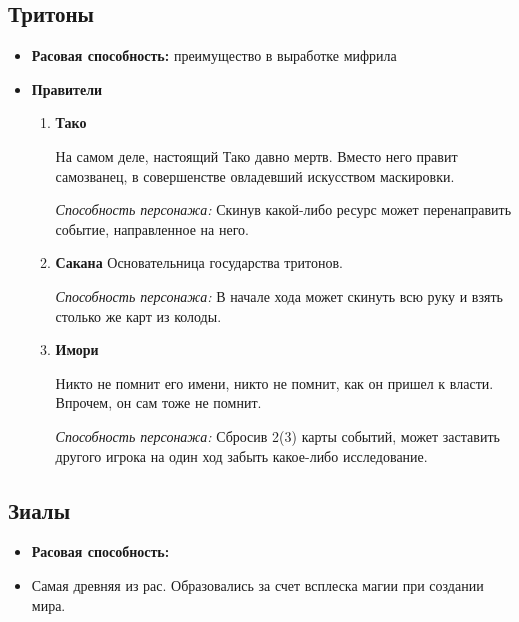 \documentclass[a4paper,12pt,landscape]{article}
\begin{document}
    \subsection{Тритоны}
    \begin{itemize}
      \item \textbf{Расовая способность:} преимущество в выработке мифрила
      \item \textbf{Правители}
        \begin{enumerate}
          \item \textbf{Тако} 
        
          На самом деле, настоящий Тако давно мертв. Вместо него правит самозванец, в совершенстве овладевший искусством маскировки.

          \textit{Способность персонажа:} Скинув какой-либо ресурс может перенаправить событие, направленное на него.
          
          \item \textbf{Сакана}
          Основательница государства тритонов.
          
          \textit{Способность персонажа:} В начале хода может скинуть всю руку и взять столько же карт из колоды.
          
          \item \textbf{Имори}
          
          Никто не помнит его имени, никто не помнит, как он пришел к власти. Впрочем, он сам тоже не помнит.
          
          \textit{Способность персонажа:} Сбросив 2(3) карты событий, может заставить другого игрока на один ход забыть какое-либо исследование.
          
        
      \end{enumerate}
    \end{itemize}
    
    \subsection{Зиалы}
    \begin {itemize}
      \item \textbf{Расовая способность:} 
      \item Самая древняя из рас. Образовались за счет всплеска магии при создании мира.
    \end{itemize}
\end{document}
